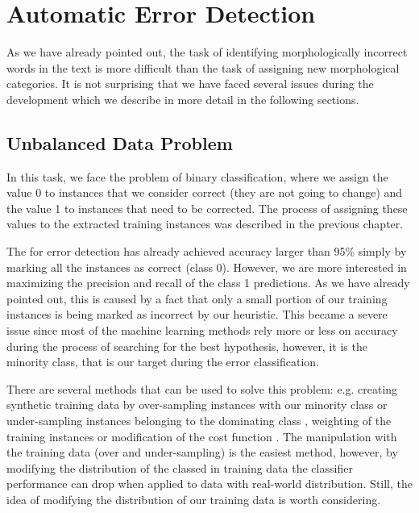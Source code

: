 \section{Automatic Error Detection}


As we have already pointed out, 
the task of identifying morphologically incorrect words in the text is more difficult
than the task of assigning new morphological categories. It is not surprising
that we have faced several issues
during the development which we describe in more detail in the following sections.



\subsection{Unbalanced Data Problem}

In this task, we face the problem of binary classification, where we
assign the value 0 to instances that we consider correct (they are not going to change) and the value 1 to
instances that need to be corrected. The process of assigning these values to the
extracted training instances was described in the previous chapter. 

The  for error detection has already achieved accuracy larger than 95\%
simply by marking all the instances as correct (class 0). However, we are more interested
in maximizing the precision and recall of the class 1 predictions.
As we have already pointed out, this is caused by a fact that only a small portion of our
training instances is being marked as incorrect by our heuristic.
This became a severe issue since most of the machine learning methods rely more or less on accuracy during
the process of searching for the best hypothesis, however, it is the minority
class, that is our target during the error classification.

There are several methods that can be used to solve this problem: e.g. creating synthetic
training data by over-sampling instances with our minority class or under-sampling instances
belonging to the dominating class \citep{Batista:2004:SBS:1007730.1007735}, weighting of the training instances or modification of the
cost function \citep{Domingos:1999:MGM:312129.312220}. The manipulation with the training data (over and under-sampling) is the easiest method,
however,
by modifying the distribution of the classed in training data the classifier performance
can drop when applied to data with real-world distribution.
Still, the idea of modifying the distribution of our training data is worth considering.

